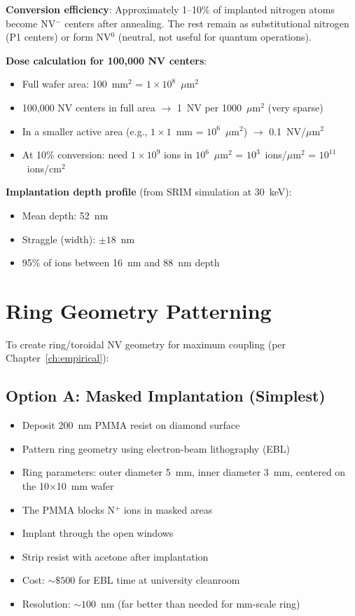 \documentclass[11pt,a4paper,openany]{book}
\begin{document}
\noindent
\textbf{Conversion efficiency}: Approximately 1--10\% of implanted nitrogen atoms become NV$^-$ centers after annealing. The rest remain as substitutional nitrogen (P1 centers) or form NV$^0$ (neutral, not useful for quantum operations).

\noindent
\textbf{Dose calculation for 100,000 NV centers}:
\begin{itemize}[nosep]
  \item Full wafer area: 100~mm$^2$ = $1 \times 10^8$~$\mu$m$^2$
  \item 100,000 NV centers in full area $\to$ 1~NV per 1000~$\mu$m$^2$ (very sparse)
  \item In a smaller active area (e.g., $1 \times 1$~mm = $10^6$~$\mu$m$^2$) $\to$ 0.1~NV/$\mu$m$^2$
  \item At 10\% conversion: need $1 \times 10^9$ ions in $10^6$~$\mu$m$^2$ = $10^3$~ions/$\mu$m$^2$ = $10^{11}$~ions/cm$^2$
\end{itemize}

\noindent
\textbf{Implantation depth profile} (from SRIM simulation at 30~keV):
\begin{itemize}[nosep]
  \item Mean depth: 52~nm
  \item Straggle (width): $\pm 18$~nm
  \item 95\% of ions between 16~nm and 88~nm depth
\end{itemize}

\section{Ring Geometry Patterning}

To create ring/toroidal NV geometry for maximum coupling (per Chapter~\ref{ch:empirical}):

\subsection{Option A: Masked Implantation (Simplest)}

\begin{itemize}[nosep]
  \item Deposit 200~nm PMMA resist on diamond surface
  \item Pattern ring geometry using electron-beam lithography (EBL)
  \item Ring parameters: outer diameter 5~mm, inner diameter 3~mm, centered on the 10$\times$10~mm wafer
  \item The PMMA blocks N$^+$ ions in masked areas
  \item Implant through the open windows
  \item Strip resist with acetone after implantation
  \item Cost: ${\sim}\$500$ for EBL time at university cleanroom
  \item Resolution: ${\sim}100$~nm (far better than needed for mm-scale ring)
\end{itemize}
\end{document}
